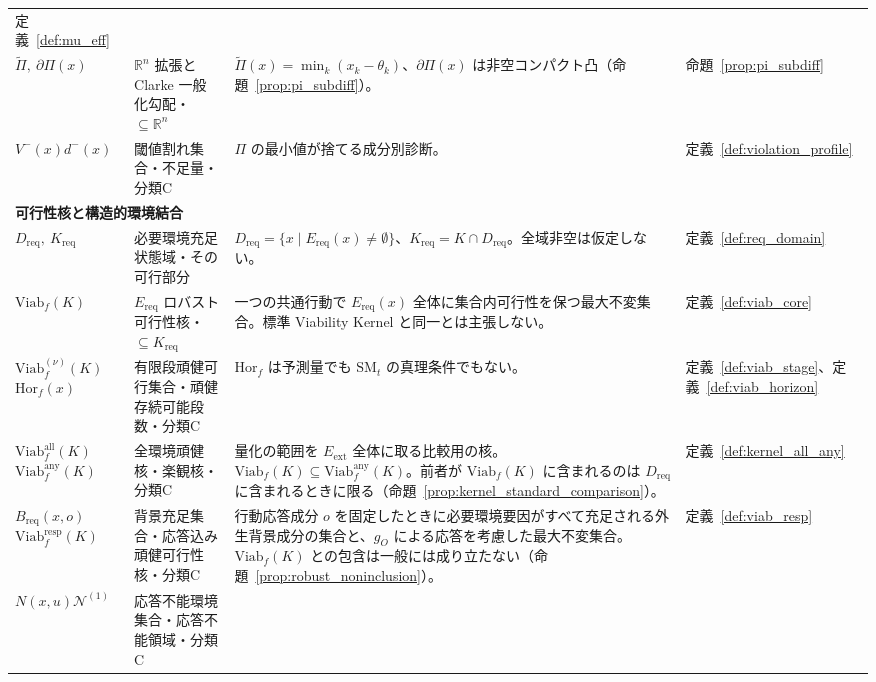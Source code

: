 \begin{longtable}{p{3.0cm} p{3.0cm} p{6.6cm} p{2.0cm}}
定義~\ref{def:mu_eff} \\[3pt]
$\widetilde\Pi,\ \partial\Pi(x)$ & $\mathbb R^n$ 拡張と Clarke 一般化勾配・$\subseteq\mathbb R^n$ &
$\widetilde\Pi(x)=\min_k(x_k-\theta_k)$、$\partial\Pi(x)$ は非空コンパクト凸（命題~\ref{prop:pi_subdiff}）。 &
命題~\ref{prop:pi_subdiff} \\[3pt]
$V^-(x)$\newline $d^-(x)$ & 閾値割れ集合・不足量・分類C &
$\Pi$ の最小値が捨てる成分別診断。 &
定義~\ref{def:violation_profile} \\[3pt]
\multicolumn{4}{l}{\textbf{可行性核と構造的環境結合}} \\[2pt]
$D_{\mathrm{req}},\ K_{\mathrm{req}}$ & 必要環境充足状態域・その可行部分 &
$D_{\mathrm{req}}=\{x\mid E_{\mathrm{req}}(x)\neq\emptyset\}$、$K_{\mathrm{req}}=K\cap D_{\mathrm{req}}$。全域非空は仮定しない。 &
定義~\ref{def:req_domain} \\[3pt]
$\mathrm{Viab}_f(K)$ & $E_{\mathrm{req}}$ ロバスト可行性核・$\subseteq K_{\mathrm{req}}$ &
一つの共通行動で $E_{\mathrm{req}}(x)$ 全体に集合内可行性を保つ最大不変集合。標準 Viability Kernel と同一とは主張しない。 &
定義~\ref{def:viab_core} \\[3pt]
$\mathrm{Viab}_f^{(\nu)}(K)$\newline $\mathrm{Hor}_f(x)$ & 有限段頑健可行集合・頑健存続可能段数・分類C &
$\mathrm{Hor}_f$ は予測量でも $\mathrm{SM}_t$ の真理条件でもない。 &
定義~\ref{def:viab_stage}、定義~\ref{def:viab_horizon} \\[3pt]
$\mathrm{Viab}_f^{\mathrm{all}}(K)$\newline $\mathrm{Viab}_f^{\mathrm{any}}(K)$ & 全環境頑健核・楽観核・分類C &
量化の範囲を $E_{\mathrm{ext}}$ 全体に取る比較用の核。$\mathrm{Viab}_f(K)\subseteq\mathrm{Viab}_f^{\mathrm{any}}(K)$。前者が $\mathrm{Viab}_f(K)$ に含まれるのは $D_{\mathrm{req}}$ に含まれるときに限る（命題~\ref{prop:kernel_standard_comparison}）。 &
定義~\ref{def:kernel_all_any} \\[3pt]
$B_{\mathrm{req}}(x,o)$\newline $\mathrm{Viab}^{\mathrm{resp}}_f(K)$ & 背景充足集合・応答込み頑健可行性核・分類C &
行動応答成分 $o$ を固定したときに必要環境要因がすべて充足される外生背景成分の集合と、$g_O$ による応答を考慮した最大不変集合。$\mathrm{Viab}_f(K)$ との包含は一般には成り立たない（命題~\ref{prop:robust_noninclusion}）。 &
定義~\ref{def:viab_resp} \\[3pt]
$N(x,u)$\newline $\mathcal N^{(1)}$ & 応答不能環境集合・応答不能領域・分類C &

\end{longtable}
